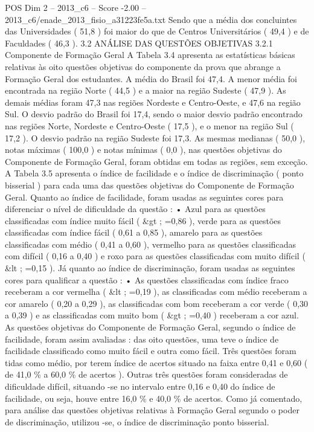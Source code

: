 \begin{textsample}{POS Dim 2 – 2013\_c6 – Score -2.00 – 2013\_c6/enade\_2013\_fisio\_a31223fe5a.txt}
Sendo que a média dos concluintes das Universidades ( 51,8 ) foi maior do que de Centros Universitários ( 49,4 ) e de Faculdades ( 46,3 ). 3.2 ANÁLISE DAS QUESTÕES OBJETIVAS 3.2.1 Componente de Formação Geral A Tabela 3.4 apresenta as estatísticas básicas relativas às oito questões objetivas do componente da prova que abrange a Formação Geral dos estudantes.
A média do Brasil foi 47,4.
A menor média foi encontrada na região Norte ( 44,5 ) e a maior na região Sudeste ( 47,9 ).
As demais médias foram 47,3 nas regiões Nordeste e Centro-Oeste, e 47,6 na região Sul.
O desvio padrão do Brasil foi 17,4, sendo o maior desvio padrão encontrado nas regiões Norte, Nordeste e Centro-Oeste ( 17,5 ), e o menor na região Sul ( 17,2 ).
O desvio padrão na região Sudeste foi 17,3.
As mesmas medianas ( 50,0 ), notas máximas ( 100,0 ) e notas mínimas ( 0,0 ), nas questões objetivas do Componente de Formação Geral, foram obtidas em todas as regiões, sem exceção.
A Tabela 3.5 apresenta o índice de facilidade e o índice de discriminação ( ponto bisserial ) para cada uma das questões objetivas do Componente de Formação Geral.
Quanto ao índice de facilidade, foram usadas as seguintes cores para diferenciar o nível de dificuldade da questão : • Azul para as questões classificadas com índice muito fácil ( \&gt ; =0,86 ), verde para as questões classificadas com índice fácil ( 0,61 a 0,85 ), amarelo para as questões classificadas com médio ( 0,41 a 0,60 ), vermelho para as questões classificadas com difícil ( 0,16 a 0,40 ) e roxo para as questões classificadas com muito difícil ( \&lt ; =0,15 ).
Já quanto ao índice de discriminação, foram usadas as seguintes cores para qualificar a questão : • As questões classificadas com índice fraco receberam a cor vermelha ( \&lt ; =0,19 ), as classificadas com médio receberam a cor amarelo ( 0,20 a 0,29 ), as classificadas com bom receberam a cor verde ( 0,30 a 0,39 ) e as classificadas com muito bom ( \&gt ; =0,40 ) receberam a cor azul.
As questões objetivas do Componente de Formação Geral, segundo o índice de facilidade, foram assim avaliadas : das oito questões, uma teve o índice de facilidade classificado como muito fácil e outra como fácil.
Três questões foram tidas como médio, por terem índice de acertos situado na faixa entre 0,41 e 0,60 ( de 41,0 \% a 60,0 \% de acertos ).
Outras três questões foram consideradas de dificuldade difícil, situando -se no intervalo entre 0,16 e 0,40 do índice de facilidade, ou seja, houve entre 16,0 \% e 40,0 \% de acertos.
Como já comentado, para análise das questões objetivas relativas à Formação Geral segundo o poder de discriminação, utilizou -se, o índice de discriminação ponto bisserial.

\end{textsample}
